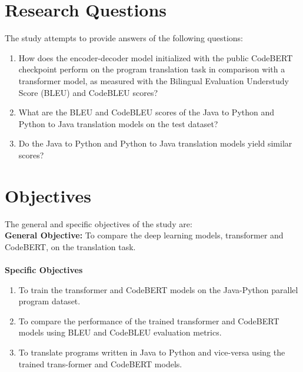 \newpage

\section{Research Questions}
The study attempts to provide answers of the following questions:
\begin{enumerate}[nosep, label = \roman*.]
\item How does the encoder-decoder model initialized with the public CodeBERT checkpoint perform on the program translation task in comparison with a transformer model, as measured with the Bilingual Evaluation Understudy Score (BLEU) and CodeBLEU scores?
\item What are the BLEU and CodeBLEU scores of the Java to Python and Python to Java translation models on the test dataset?
\item Do the Java to Python and Python to Java translation models yield similar scores?
\end{enumerate}	

\section{Objectives}
The general and specific objectives of the study are:
\\
\textbf{General Objective:} To compare the deep learning models, transformer and CodeBERT, on the translation task.
\\\\
\textbf{Specific Objectives}
\begin{enumerate}[nosep, label = \roman*.]
\item To train the transformer and CodeBERT models on the Java-Python parallel program dataset.
\item To compare the performance of the trained transformer and CodeBERT models using BLEU and CodeBLEU evaluation metrics.
\item To translate programs written in Java to Python and vice-versa using the trained trans-former and CodeBERT models.
\end{enumerate}

